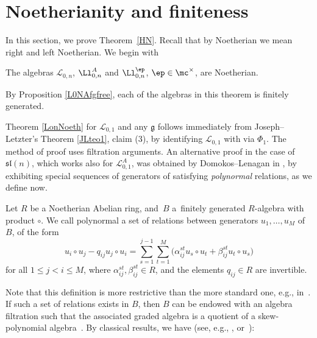 \section{Noetherianity and finiteness}\label{HNsec}
In this section, we prove Theorem~\ref{HN}. Recall that by Noetherian we mean right and left Noetherian. We begin with

\begin{teo} \label{LonNoeth} The algebras ${\mathcal L}_{0,n}$, $\Ll_{0,n}^A$ and $\Ll_{0,n}^\ep$, $\ep\in \mc^\times$, are Noetherian.
\end{teo}

By Proposition \ref{L0NAfgfree}, each of the algebras in this theorem is finitely generated.

Theorem \ref{LonNoeth} for ${\mathcal L}_{0,1}$ and any $\mathfrak{g}$ follows immediately from Joseph--Letzter's Theorem \ref{JLteo1}, claim (3), by identifying ${\mathcal L}_{0,1}$ with  via $\Phi_1$. The method of proof uses filtration arguments. An alternative proof in the case of $\mathfrak{sl}(n)$, which works also for ${\mathcal L}_{0,1}^A$, was obtained by Domokos--Lenagan in \cite{DomLen}, by exhibiting special sequences of generators of  satisfying {\it polynormal} relations, as we define now.

\begin{defi} Let $R$ be a Noetherian Abelian ring, and~$B$ a~finitely generated $R$-algebra with product $\circ$. We call polynormal a set of relations between generators $u_1,\dots,u_M$ of~$B$, of the form{\samepage
\begin{equation}\label{echangegrad++}
u_i\circ u_j - q_{ij} u_j\circ u_i = \sum_{s=1}^{j-1}\sum_{t=1}^M \bigl(\alpha_{ij}^{st} u_s\circ u_t + \beta_{ij}^{st} u_t\circ u_s\bigr)
\end{equation}
for all $1\leq j<i\leq M$, where $\alpha_{ij}^{st}, \beta_{ij}^{st} \in R$, and the elements $q_{ij}\in R$ are invertible.}
\end{defi}
Note that this definition is more restrictive than the more standard one, e.g., in~\cite[Definition~II.4.1]{BG}. If such a set of relations exists in $B$, then $B$ can be endowed with an algebra filtration such that the associated graded algebra is a quotient of a skew-polynomial algebra~\cite[Proposition I.8.17]{BG}. By classical results, we have (see, e.g., \cite[Theorems~1.2.9, 1.6.9 and Examples~1.6.11]{MC-R}, or~\cite[Lemmas~3.130--3.131]{VY}):

